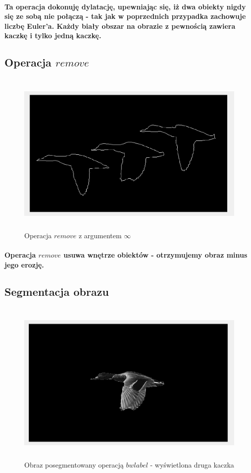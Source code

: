 \documentclass[a4paper,12pt]{article}
\begin{document}
\begin{justify}
\paragraph{Ta operacja dokonuję dylatację, upewniając się, iż dwa obiekty nigdy się ze sobą nie połączą - tak jak w poprzednich przypadka zachowuje liczbę Euler'a. Każdy biały obszar na obrazie z pewnością zawiera kaczkę i tylko jedną kaczkę.}

\newpage

\subsection{Operacja $remove$}

\begin{figure}[h]
\centering
\includegraphics[width=12cm, height=8cm]{6}
\caption{Operacja $remove$ z argumentem $\infty$}
\end{figure}

\paragraph{Operacja $remove$ usuwa wnętrze obiektów - otrzymujemy obraz minus jego erozję.}

\subsection{Segmentacja obrazu}

\begin{figure}[h]
\centering
\includegraphics[width=12cm, height=8cm]{7}
\caption{Obraz posegmentowany operacją $bwlabel$ - wyświetlona druga kaczka}
\end{figure}


\end{justify}
\end{document}
